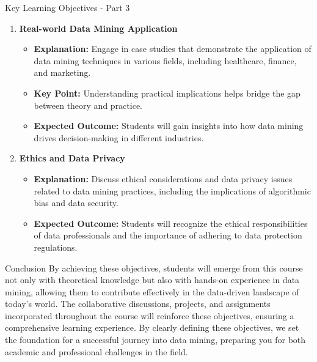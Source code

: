 \documentclass[aspectratio=169]{beamer}
\begin{document}
\begin{frame}[fragile]{Key Learning Objectives - Part 3}
    \begin{enumerate}[resume]
        \item \textbf{Real-world Data Mining Application}
        \begin{itemize}
            \item \textbf{Explanation:} Engage in case studies that demonstrate the application of data mining techniques in various fields, including healthcare, finance, and marketing.
            \item \textbf{Key Point:} Understanding practical implications helps bridge the gap between theory and practice.
            \item \textbf{Expected Outcome:} Students will gain insights into how data mining drives decision-making in different industries.
        \end{itemize}

        \item \textbf{Ethics and Data Privacy}
        \begin{itemize}
            \item \textbf{Explanation:} Discuss ethical considerations and data privacy issues related to data mining practices, including the implications of algorithmic bias and data security.
            \item \textbf{Expected Outcome:} Students will recognize the ethical responsibilities of data professionals and the importance of adhering to data protection regulations.
        \end{itemize}
    \end{enumerate}
\end{frame}

\begin{frame}[fragile]{Conclusion}
    By achieving these objectives, students will emerge from this course not only with theoretical knowledge but also with hands-on experience in data mining, allowing them to contribute effectively in the data-driven landscape of today’s world. 
    The collaborative discussions, projects, and assignments incorporated throughout the course will reinforce these objectives, ensuring a comprehensive learning experience. 
    By clearly defining these objectives, we set the foundation for a successful journey into data mining, preparing you for both academic and professional challenges in the field.
\end{frame}
\end{document}
